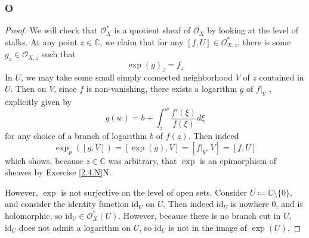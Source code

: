 \documentclass{article}
\newcommand{\C}{\mathbb{C}}
\newcommand{\id}{\mathrm{id}}
\newcommand{\fO}{\mathscr{O}}
\begin{document}
\subsubsection{O}\label{2.4.O}
\begin{proof}
    We will check that $\fO_X^*$ is a quotient sheaf of $\fO_X$ by looking at the level of stalks. At any point $z\in \C$, we claim that for any $[f,U]\in \fO_{X,z}^*$, there is some $g_z\in \fO_{X,z}$ such that
    \[
    \exp(g)_z=f_z
    \]
    In $U$, we may take some small simply connected neighborhood $V$ of $z$ contained in $U$. Then on \( V \), since \( f \) is non-vanishing, there exists a logarithm \( g \) of \( f|_V \) \cite{sarason2007complex}, explicitly given by
\[
g(w)=b+\int_z^w \frac{f'(\xi)}{f(\xi)}d\xi
\]
for any choice of a branch of logarithm \( b \) of \( f(z) \). Then indeed
\[
\exp_p([g,V])=[\exp(g),V]=[f\vert_V,V]=[f,U]
\]
which shows, because $z\in \C$ was arbitrary, that $\exp$ is an epimorphism of sheaves by Exercise \ref{2.4.N}N.

However, $\exp$ is not surjective on the level of open sets. Consider $U\coloneqq \C\setminus \{0\}$, and consider the identity function $\id_U$ on $U$. Then indeed $\id_U$ is nowhere $0$, and is holomorphic, so $\id_U\in \fO_X^*(U)$. However, because there is no branch cut in $U$, $\id_U$ does not admit a logarithm on $U$, so $\id_U$ is not in the image of $\exp(U)$.
\end{proof}
\subsection{}
\end{document}
